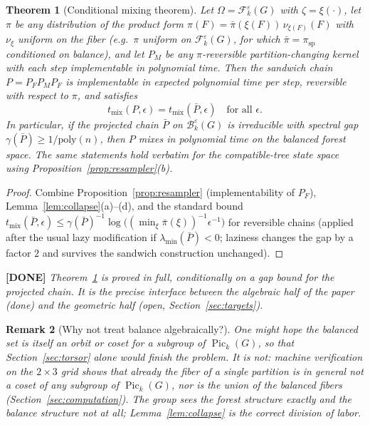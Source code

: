 \documentclass[11pt]{article}
\newcommand{\done}[1]{\medskip\noindent\textcolor{donecol}{\textbf{[DONE]} \emph{#1}}\medskip}
\newcommand{\Pick}[1]{\operatorname{Pic}_k(#1)}
\newcommand{\Fcal}{\mathcal{F}}
\newcommand{\Bcal}{\mathcal{B}}
\newtheorem{theorem}{Theorem}[section]
\newtheorem{remark}[theorem]{Remark}
\begin{document}
\begin{theorem}[Conditional mixing theorem]
\label{thm:conditional}
Let $\Omega = \Fcal_k^\varepsilon(G)$ with $\zeta = \xi(\cdot)$, let $\pi$
be any distribution of the product form $\pi(F) = \bar\pi(\xi(F))\,
\nu_{\xi(F)}(F)$ with $\nu_\xi$ uniform on the fiber (e.g.\ $\pi$ uniform on
$\Fcal_k^\varepsilon(G)$, for which $\bar\pi = \pi_{\mathrm{sp}}$
conditioned on balance), and let $P_M$ be any $\pi$-reversible
partition-changing kernel with each step implementable in polynomial time.
Then the sandwich chain $P = P_F P_M P_F$ is implementable in expected
polynomial time per step, reversible with respect to $\pi$, and satisfies
\[
  t_{\mathrm{mix}}(P, \epsilon) = t_{\mathrm{mix}}(\bar P, \epsilon)
  \quad \text{for all } \epsilon .
\]
In particular, if the projected chain $\bar P$ on
$\Bcal_k^\varepsilon(G)$ is irreducible with spectral gap
$\gamma(\bar P) \ge 1/\mathrm{poly}(n)$, then $P$ mixes in polynomial time
on the balanced forest space. The same statements hold verbatim for the
compatible-tree state space using
Proposition~\ref{prop:resampler}(b).
\end{theorem}

\begin{proof}
Combine Proposition~\ref{prop:resampler} (implementability of $P_F$),
Lemma~\ref{lem:collapse}(a)--(d), and the standard bound
$t_{\mathrm{mix}}(\bar P, \epsilon) \le
\gamma(\bar P)^{-1} \log \bigl( (\min_\xi \bar\pi(\xi))^{-1}
\epsilon^{-1} \bigr)$ for reversible chains (applied after the usual lazy
modification if $\lambda_{\min}(\bar P) < 0$; laziness changes the gap by a
factor $2$ and survives the sandwich construction unchanged).
\end{proof}

\done{Theorem~\ref{thm:conditional} is proved in full, \emph{conditionally
on a gap bound for the projected chain}. It is the precise interface between
the algebraic half of the paper (done) and the geometric half (open,
Section~\ref{sec:targets}).}

\begin{remark}[Why not treat balance algebraically?]
One might hope the balanced set is itself an orbit or coset for a subgroup
of $\Pick{G}$, so that Section~\ref{sec:torsor} alone would finish the
problem. It is not: machine verification on the $2 \times 3$ grid shows that
already the fiber of a single partition is in general \emph{not} a coset of
any subgroup of $\Pick{G}$, nor is the union of the balanced fibers
(Section~\ref{sec:computation}). The group sees the forest structure
exactly and the balance structure not at all; Lemma~\ref{lem:collapse} is
the correct division of labor.
\end{remark}
\end{document}
